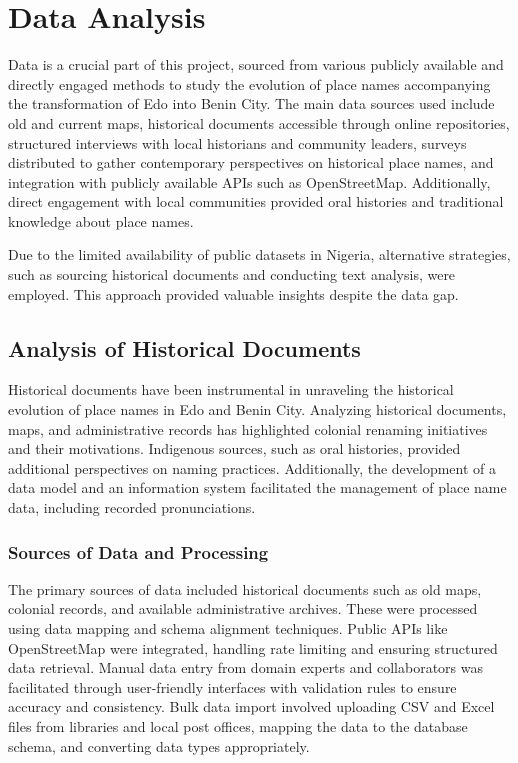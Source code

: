 \chapter{Data Analysis}
Data is a crucial part of this project, sourced from various publicly available and directly engaged methods to study the evolution of place names accompanying the transformation of Edo into Benin City. The main data sources used include old and current maps, historical documents accessible through online repositories, structured interviews with local historians and community leaders, surveys distributed to gather contemporary perspectives on historical place names, and integration with publicly available APIs such as OpenStreetMap. Additionally, direct engagement with local communities provided oral histories and traditional knowledge about place names.

Due to the limited availability of public datasets in Nigeria, alternative strategies, such as sourcing historical documents and conducting text analysis, were employed. This approach provided valuable insights despite the data gap.

\section{Analysis of Historical Documents}

Historical documents have been instrumental in unraveling the historical evolution of place names in Edo and Benin City. Analyzing historical documents, maps, and administrative records has highlighted colonial renaming initiatives and their motivations. Indigenous sources, such as oral histories, provided additional perspectives on naming practices. Additionally, the development of a data model and an information system facilitated the management of place name data, including recorded pronunciations.

\subsection{Sources of Data and Processing}

The primary sources of data included historical documents such as old maps, colonial records, and available administrative archives. These were processed using data mapping and schema alignment techniques. Public APIs like OpenStreetMap were integrated, handling rate limiting and ensuring structured data retrieval. Manual data entry from domain experts and collaborators was facilitated through user-friendly interfaces with validation rules to ensure accuracy and consistency. Bulk data import involved uploading CSV and Excel files from libraries and local post offices, mapping the data to the database schema, and converting data types appropriately.

